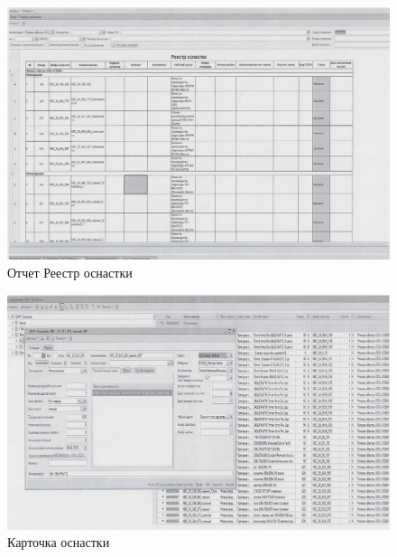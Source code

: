 \begin{figure}
\begin{center}
 \includegraphics[height=0.4\textheight, keepaspectratio]{Pics/II.5.3.jpg}
\end{center}
 \caption{Отчет Реестр оснастки }
 \label{pic:II.5.3}
\end{figure}

\begin{figure}
\begin{center}
 \includegraphics[height=0.4\textheight, keepaspectratio]{Pics/II.5.3..jpg}
\end{center}
 \caption{Карточка оснастки}
 \label{pic:II.5.3.}
\end{figure}

